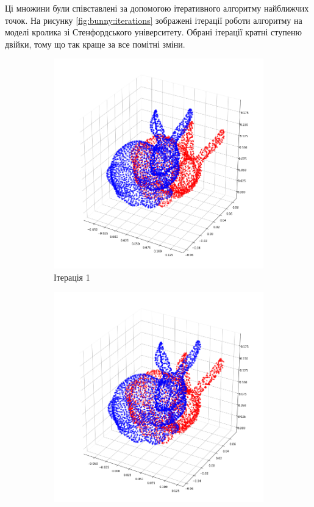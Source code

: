 Ці множини були співставлені за допомогою ітеративного алгоритму найближчих
точок.
На рисунку \ref{fig:bunny:iterations}
зображені ітерації роботи алгоритму на моделі кролика зі Стенфордського
університету.
Обрані ітерації кратні ступеню двійки, тому що так краще за все помітні зміни.

\begin{figure}[h]
  \centering
  \begin{subfigure}[b]{0.3\textwidth}
      \includegraphics[width=\textwidth]{images/bunny_1}
      \caption{Ітерація 1}
  \end{subfigure}
  \begin{subfigure}[b]{0.3\textwidth}
      \includegraphics[width=\textwidth]{images/bunny_2}

\end{subfigure}
\end{figure}

